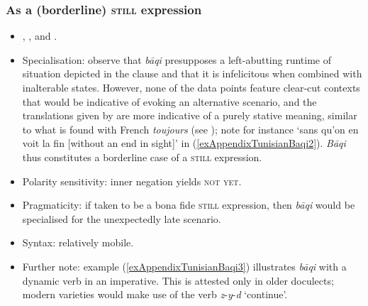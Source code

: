 \subsubsection{As a (borderline) \textsc{still} expression}
\begin{itemize}
	\item \textcite[130–131]{Jemni2011}, \textcite{FischerEtAlTunisian}, \textcite[365–366]{MarcaisGuiga19581961} and \textcite[650]{Singer1984}.
	\item Specialisation: \textcite{FischerEtAlTunisian} observe that \textit{bāqi} presupposes a left\hyp abutting runtime of situation depicted in the clause and that it is infelicitous when combined with inalterable states. However, none of the data points feature clear-cut contexts that would be indicative of evoking an alternative scenario, and the translations given by \textcite{MarcaisGuiga19581961} are more indicative of a purely stative meaning, similar to what is found with French \textit{toujours} (see ); note for instance \lq sans qu’on en voit la fin [without an end in sight]\rq{ }in (\ref{exAppendixTunisianBaqi2}). \textit{Bāqi} thus constitutes a borderline case of a \textsc{still} expression.
	\item Polarity sensitivity: inner negation yields \textsc{not yet}.
	\item Pragmaticity: if taken to be a bona fide \textsc{still} expression, then \textit{bāqi} would be specialised for the unexpectedly late scenario.
	\item Syntax: relatively mobile.
	\item Further note: example (\ref{exAppendixTunisianBaqi3}) illustrates \textit{bāqi} with a dynamic verb in an imperative. This is attested only in older doculects; modern varieties would make use of the verb \mbox{\textit{z}-\textit{y}-\textit{d}} \lq continue\rq{}.
\end{itemize}

